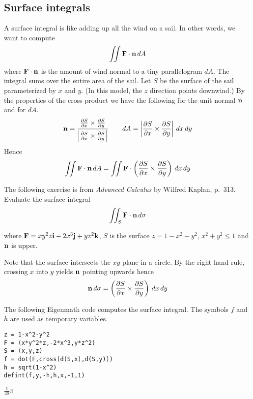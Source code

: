 
\subsection{Surface integrals}
A surface integral is like adding up all the wind on a sail.
In other words, we want to compute
$$\int\!\!\!\int{\bf F\cdot n}\,dA$$
where ${\bf F\cdot n}$ is the amount of wind normal to a tiny parallelogram $dA$.
The integral sums over the entire area of the sail.
Let $S$ be the surface of the sail parameterized by $x$ and $y$.
(In this model, the $z$ direction points downwind.)
By the properties of the cross product we have the following for the unit normal $\bf n$
and for $dA$.
$${\bf n}={ {{\partial S\over\partial x}\times{\partial S\over\partial y}}\over
 {\left|{\partial S\over\partial x}\times{\partial S\over\partial y}\right|}}\qquad
dA=\left|{\partial S\over\partial x}\times{\partial S\over\partial y}\right|\,dx\,dy$$
Hence
$$\int\!\!\!\int{\bf F\cdot n}\,dA=\int\!\!\!\int{\bf F}\cdot
\left({{\partial S\over\partial x}\times{\partial S\over\partial y}}\right)\,dx\,dy$$

\bigskip
\noindent
The following exercise is from
{\it Advanced Calculus} by Wilfred Kaplan, p.~313.
Evaluate the surface integral
$$\int\!\!\!\int_S{\bf F\cdot n}\,d\sigma$$

\noindent
where ${\bf F}=xy^2z{\bf i}-2x^3{\bf j}+yz^2{\bf k}$, $S$ is the surface
$z=1-x^2-y^2$, $x^2+y^2\le1$ and $\bf n$ is upper.

\bigskip
\noindent
Note that the surface intersects the $xy$ plane in a circle.
By the right hand rule, crossing $x$ into $y$ yields $\bf n$ pointing upwards hence
$${\bf n}\,d\sigma=\left({{\partial S\over\partial x}\times{\partial S\over\partial y}}\right)\,dx\,dy$$

\noindent
The following Eigenmath code computes the surface integral.
The symbols $f$ and $h$ are used as temporary variables.

\begin{Verbatim}[formatcom=\color{blue},samepage=true]
z = 1-x^2-y^2
F = (x*y^2*z,-2*x^3,y*z^2)
S = (x,y,z)
f = dot(F,cross(d(S,x),d(S,y)))
h = sqrt(1-x^2)
defint(f,y,-h,h,x,-1,1)
\end{Verbatim}

\noindent
$\displaystyle \frac{1}{48}\pi$
